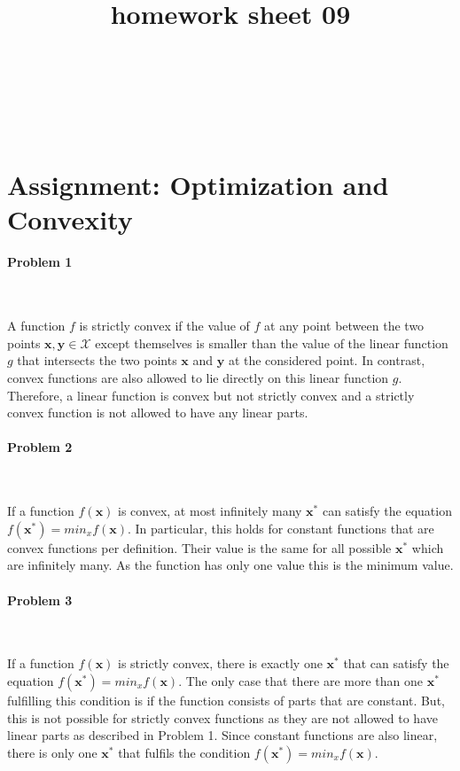 \documentclass{article}
\title{homework sheet 09}
\author{
\name{Andre Seitz}\\
\imat{03622870}\\
\email{andre.seitz@mytum.de}
\And
\name{Linda Leidig} \\
\imat{03608416}\\
\email{linda.leidig@tum.de}
}
\renewcommand{\Vec}[1]{\ensuremath{\mathbf{#1}}}
\begin{document}
\maketitle

\section{Assignment: Optimization and Convexity}
\paragraph*{Problem 1}
$\;$ 

A function $f$ is strictly convex if the value of $f$ at any point between the two points $\Vec{x},\Vec{y} \in \mathcal{X}$ except themselves is smaller than the value of the linear function $g$ that intersects the two points $\Vec{x}$ and $\Vec{y}$ at the considered point. In contrast, convex functions are also allowed to lie directly on this linear function $g$. Therefore, a linear function is convex but not strictly convex and a strictly convex function is not allowed to have any linear parts.

\paragraph*{Problem 2}
$\;$ 

If a function $f(\Vec{x})$ is convex, at most infinitely many $\Vec{x}^*$ can satisfy the equation $f(\Vec{x}^*) = min_xf(\Vec{x})$. In particular, this holds for constant functions that are convex functions per definition. Their value is the same for all possible $\Vec{x}^*$ which are infinitely many. As the function has only one value this is the minimum value.

\paragraph*{Problem 3}
$\;$ 

If a function $f(\Vec{x})$ is strictly convex, there is exactly one $\Vec{x}^*$ that can satisfy the equation $f(\Vec{x}^*) = min_xf(\Vec{x})$. The only case that there are more than one $\Vec{x}^*$ fulfilling this condition is if the function consists of parts that are constant. But, this is not possible for strictly convex functions as they are not allowed to have linear parts as described in Problem 1. Since constant functions are also linear, there is only one $\Vec{x}^*$ that fulfils the condition $f(\Vec{x}^*) = min_xf(\Vec{x})$.
\end{document}
